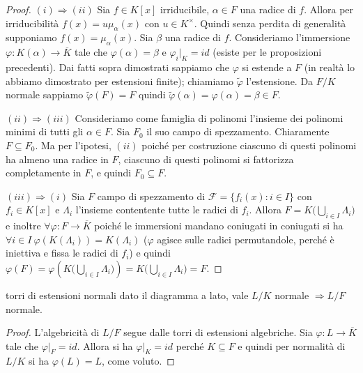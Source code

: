 \begin{proof}
    $(i) \Rightarrow (ii)$ Sia $f \in K[x]$ irriducibile, $\alpha\in F$ una radice di $f$. Allora per irriducibilità $f(x) = u\mu_{\alpha}(x)$ con $u \in K^\times$. Quindi senza perdita di generalità supponiamo $f(x) = \mu_{\alpha}(x)$. Sia $\beta$ una radice di $f$. Consideriamo l'immersione $\varphi: K(\alpha) \rightarrow \overline{K}$ tale che $\varphi(\alpha) = \beta$ e $\varphi_i|_K = id$ (esiste per le proposizioni precedenti). Dai fatti sopra dimostrati sappiamo che $\varphi$ si estende a $F$ (in realtà lo abbiamo dimostrato per estensioni finite); chiamiamo $\tilde \varphi$ l'estensione. Da $F/K$ normale sappiamo $\tilde \varphi (F) = F$ quindi $\tilde \varphi(\alpha) = \varphi(\alpha) = \beta \in F$.
    
    $(ii) \Rightarrow (iii)$ Consideriamo come famiglia di polinomi l'insieme dei polinomi minimi di tutti gli $\alpha \in F$. Sia $F_0$ il suo campo di spezzamento. Chiaramente $F \subseteq F_0$. Ma per l'ipotesi, $(ii)$ poiché per costruzione ciascuno di questi polinomi ha almeno una radice in $F$, ciascuno di questi polinomi si fattorizza completamente in $F$, e quindi $F_0 \subseteq F$.
    
    $(iii) \Rightarrow (i)$ Sia $F$ campo di spezzamento di $\mathscr{F} = \{f_i(x) : i \in I\}$ con $f_i \in K[x]$ e  $\Lambda_i$ l'insieme contentente tutte le radici di $f_i$. Allora $F = K\big( \bigcup_{i \in I} \Lambda_i \big)$ e inoltre $\forall \varphi: F \rightarrow \overline{K}$ poiché le immersioni mandano coniugati in coniugati si ha $\forall i \in I \ \varphi(K(\Lambda_i)) = K(\Lambda_i)$ ($\varphi$ agisce sulle radici permutandole, perché è iniettiva e fissa le radici di $f_i$) e quindi $\varphi(F) = \varphi(K\big( \bigcup_{i \in I} \Lambda_i \big))= K\big( \bigcup_{i \in I} \Lambda_i \big) = F$.
\end{proof}
\begin{minipage}{0.9\textwidth}  
\begin{theorem}{torri di estensioni normali}
    dato il diagramma a lato, vale $L/K$ normale $\Rightarrow L/F$ normale.
\end{theorem}
\begin{proof}
    L'algebricità di $L/F$ segue dalle torri di estensioni algebriche. Sia $\varphi: L \rightarrow \overline{K}$ tale che $\varphi|_F = id$. Allora si ha $\varphi|_K = id$ perché $K \subseteq F$ e quindi per normalità di $L/K$ si ha $\varphi(L) = L$, come voluto.
\end{proof}
\end{minipage}\hfill
